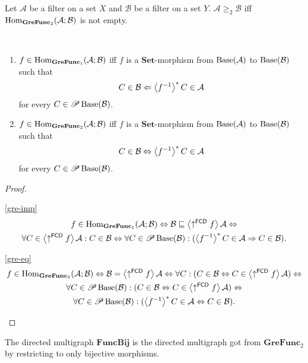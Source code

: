 \begin{defn}
Let $\mathcal{A}$ be a filter on a set $X$ and $\mathcal{B}$ be
a filter on a set $Y$. $\mathcal{A}\ge_{2}\mathcal{B}$ iff $\operatorname{Hom}_{\mathbf{GreFunc}_{2}}(\mathcal{A};\mathcal{B})$
is not empty.\end{defn}
\begin{prop}
~
\begin{enumerate}
\item \label{gre-imp}$f\in\operatorname{Hom}_{\mathbf{GreFunc}_{1}}(\mathcal{A};\mathcal{B})$
iff $f$ is a $\mathbf{Set}$-morphism from $\operatorname{Base}(\mathcal{A})$
to $\operatorname{Base}(\mathcal{B})$ such that
\[
C\in\mathcal{B}\Leftarrow\left\langle f^{-1}\right\rangle ^{\ast}C\in\mathcal{A}
\]
for every $C\in\mathscr{P}\operatorname{Base}(\mathcal{B})$.
\item \label{gre-eq}$f\in\operatorname{Hom}_{\mathbf{GreFunc}_{2}}(\mathcal{A};\mathcal{B})$
iff $f$ is a $\mathbf{Set}$-morphism from $\operatorname{Base}(\mathcal{A})$
to $\operatorname{Base}(\mathcal{B})$ such that
\[
C\in\mathcal{B}\Leftrightarrow\left\langle f^{-1}\right\rangle ^{\ast}C\in\mathcal{A}
\]
for every $C\in\mathscr{P}\operatorname{Base}(\mathcal{B})$.
\end{enumerate}
\end{prop}
\begin{proof}
~
\begin{widedisorder}
\item [{\ref{gre-imp}}] ~
\begin{multline*}
f\in\operatorname{Hom}_{\mathbf{GreFunc}_{1}}(\mathcal{A};\mathcal{B})\Leftrightarrow\mathcal{B}\sqsubseteq\left\langle \uparrow^{\mathsf{FCD}}f\right\rangle\mathcal{A}\Leftrightarrow\\
\forall C\in\left\langle \uparrow^{\mathsf{FCD}}f\right\rangle\mathcal{A}:C\in\mathcal{B}\Leftrightarrow\forall C\in\mathscr{P}\operatorname{Base}(\mathcal{B}):(\left\langle f^{-1}\right\rangle ^{\ast}C\in\mathcal{A}\Rightarrow C\in\mathcal{B}).
\end{multline*}

\item [{\ref{gre-eq}}] ~
\begin{multline*}
f\in\operatorname{Hom}_{\mathbf{GreFunc}_{2}}(\mathcal{A};\mathcal{B})\Leftrightarrow\mathcal{B}=\left\langle \uparrow^{\mathsf{FCD}}f\right\rangle\mathcal{A}\Leftrightarrow\forall C:(C\in\mathcal{B}\Leftrightarrow C\in\left\langle \uparrow^{\mathsf{FCD}}f\right\rangle\mathcal{A})\Leftrightarrow\\
\forall C\in\mathscr{P}\operatorname{Base}(\mathcal{B}):(C\in\mathcal{B}\Leftrightarrow C\in\left\langle \uparrow^{\mathsf{FCD}}f\right\rangle\mathcal{A})\Leftrightarrow\\
\forall C\in\mathscr{P}\operatorname{Base}(\mathcal{B}):(\left\langle f^{-1}\right\rangle ^{\ast}C\in\mathcal{A}\Leftrightarrow C\in\mathcal{B}).
\end{multline*}

\end{widedisorder}
\end{proof}
\begin{defn}
The directed multigraph $\mathbf{FuncBij}$ is the directed multigraph
got from $\mathbf{GreFunc}_{2}$ by restricting to only bijective
morphisms.
\end{defn}

